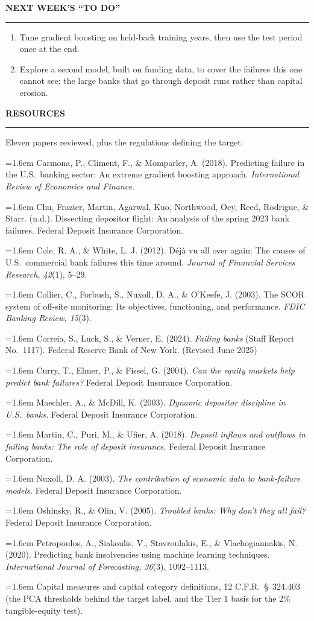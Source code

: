 \documentclass[11pt,letterpaper]{article}
\newcommand{\sectionhead}[1]{%
  \needspace{5\baselineskip}\vspace{6pt}%
  {\sffamily\bfseries\fontsize{9.5}{12}\selectfont\color{navy}\MakeUppercase{#1}}\par
  \vspace{-9pt}\textcolor{hairline}{\rule{\textwidth}{0.5pt}}\par\vspace{0pt}}
\newcommand{\answer}[1]{#1\par\vspace{3pt}}
\begin{document}
\sectionhead{Next week's ``To Do''}
\answer{\begin{enumerate}[topsep=1pt,itemsep=1pt,leftmargin=16pt,label=\textcolor{navy}{\bfseries\arabic*.}]
  \item Tune gradient boosting on held-back training years, then use the test period once at the end.
  \item Explore a second model, built on funding data, to cover the failures this one cannot see: the large banks that go through deposit runs rather than capital erosion.
\end{enumerate}}

\sectionhead{Resources}
\answer{Eleven papers reviewed, plus the regulations defining the target:
{\fontsize{8.8}{10.8}\selectfont\setlength{\parskip}{2pt}\par\vspace{3pt}
\newcommand{\refentry}[1]{\hangindent=1.6em\hangafter=1 #1\par}
\refentry{Carmona, P., Climent, F., \& Momparler, A. (2018). Predicting failure in the U.S.\ banking sector: An extreme gradient boosting approach. \textit{International Review of Economics and Finance}.}
\refentry{Chu, Frazier, Martin, Agarwal, Kuo, Northwood, Oey, Reed, Rodrigue, \& Starr. (n.d.). Dissecting depositor flight: An analysis of the spring 2023 bank failures. Federal Deposit Insurance Corporation.}
\refentry{Cole, R. A., \& White, L. J. (2012). D\'{e}j\`{a} vu all over again: The causes of U.S.\ commercial bank failures this time around. \textit{Journal of Financial Services Research, 42}(1), 5--29.}
\refentry{Collier, C., Forbush, S., Nuxoll, D. A., \& O'Keefe, J. (2003). The SCOR system of off-site monitoring: Its objectives, functioning, and performance. \textit{FDIC Banking Review, 15}(3).}
\refentry{Correia, S., Luck, S., \& Verner, E. (2024). \textit{Failing banks} (Staff Report No.\ 1117). Federal Reserve Bank of New York. (Revised June 2025)}
\refentry{Curry, T., Elmer, P., \& Fissel, G. (2004). \textit{Can the equity markets help predict bank failures?} Federal Deposit Insurance Corporation.}
\refentry{Maechler, A., \& McDill, K. (2003). \textit{Dynamic depositor discipline in U.S.\ banks.} Federal Deposit Insurance Corporation.}
\refentry{Martin, C., Puri, M., \& Ufier, A. (2018). \textit{Deposit inflows and outflows in failing banks: The role of deposit insurance.} Federal Deposit Insurance Corporation.}
\refentry{Nuxoll, D. A. (2003). \textit{The contribution of economic data to bank-failure models.} Federal Deposit Insurance Corporation.}
\refentry{Oshinsky, R., \& Olin, V. (2005). \textit{Troubled banks: Why don't they all fail?} Federal Deposit Insurance Corporation.}
\refentry{Petropoulos, A., Siakoulis, V., Stavroulakis, E., \& Vlachogiannakis, N. (2020). Predicting bank insolvencies using machine learning techniques. \textit{International Journal of Forecasting, 36}(3), 1092--1113.}
\refentry{Capital measures and capital category definitions, 12 C.F.R.\ \S\ 324.403 (the PCA thresholds behind the target label, and the Tier 1 basis for the 2\% tangible-equity test).}
}}
\end{document}
